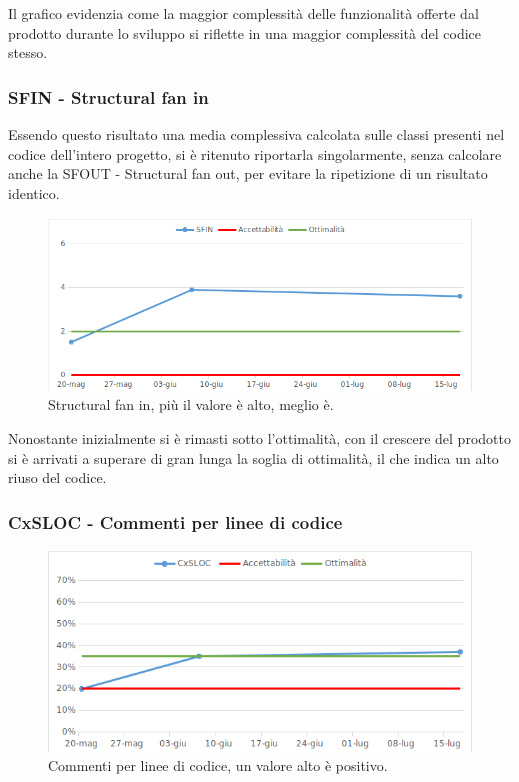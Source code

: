 Il grafico evidenzia come la maggior complessità delle funzionalità offerte dal prodotto durante lo sviluppo si riflette in una maggior complessità del codice stesso.

\subsubsection{SFIN - Structural fan in}

Essendo questo risultato una media complessiva calcolata sulle classi presenti nel codice dell'intero progetto, si è ritenuto riportarla singolarmente, senza calcolare anche la SFOUT - Structural fan out, per evitare la ripetizione di un risultato identico.

\begin{figure}[h!]
	\centering
	\includegraphics[scale=0.75]{img/Grafici/SFIN.png}
	\caption{Structural fan in, più il valore è alto, meglio è.}
	\label{fig:SFIN}
\end{figure}

Nonostante inizialmente si è rimasti sotto l'ottimalità, con il crescere del prodotto si è arrivati a superare di gran lunga la soglia di ottimalità, il che indica un alto riuso del codice. 

\subsubsection{CxSLOC - Commenti per linee di codice}

\begin{figure}[h!]
	\centering
	\includegraphics[scale=0.75]{img/Grafici/CxSLOC.png}
	\caption{Commenti per linee di codice, un valore alto è positivo.}
	\label{fig:CxSLOC}
\end{figure}


